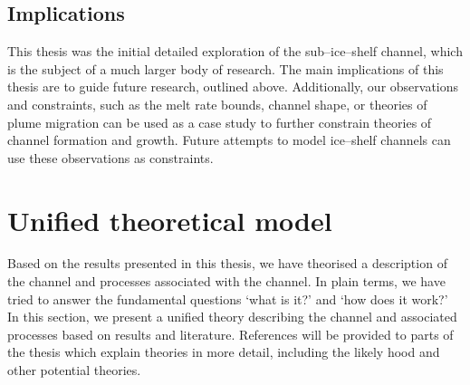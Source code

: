\subsection{Implications}

This thesis was the initial detailed exploration of the sub--ice--shelf channel, which is the subject of a much larger body of research. The main implications of this thesis are to guide future research, outlined above. Additionally, our observations and constraints, such as the melt rate bounds, channel shape, or theories of plume migration can be used as a case study to further constrain theories of channel formation and growth. Future attempts to model ice--shelf channels can use these observations as constraints. 


\section{Unified theoretical model} \label{sec:unified}

Based on the results presented in this thesis, we have theorised a description of the channel and processes associated with the channel.  In plain terms, we have tried to answer the fundamental questions `what is it?' and `how does it work?' In this section, we present a unified theory describing the channel and associated processes based on results and literature.  References will be provided to parts of the thesis which explain theories in more detail, including the likely hood and other potential theories.

